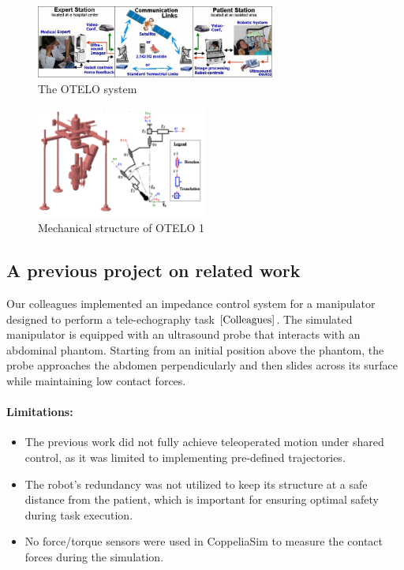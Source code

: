 \documentclass{article}
\begin{document}
\begin{figure}[h]
    \centering
    \includegraphics[width=0.7\textwidth]{OTELO.png}  
    \caption{The OTELO system}
    \label{fig:otelo}
\end{figure}


\begin{figure}[h]
    \centering
    \includegraphics[width=0.5\textwidth]{OTELO_structure.png}  
    \caption{Mechanical structure of OTELO 1}
    \label{fig:otelo struc}
\end{figure}

\subsection{A previous project on related work}
Our colleagues implemented an impedance control system for a manipulator designed to perform a tele-echography task $\cite{Colleagues}$. The simulated manipulator is equipped with an ultrasound probe that interacts with an abdominal phantom. Starting from an initial position above the phantom, the probe approaches the abdomen perpendicularly and then slides across its surface while maintaining low contact forces.

\paragraph{Limitations:}
\begin{itemize}
\item The previous work did not fully achieve teleoperated motion under shared control, as it was limited to implementing pre-defined trajectories.
\item The robot's redundancy was not utilized to keep its structure at a safe distance from the patient, which is important for ensuring optimal safety during task execution.
\item No force/torque sensors were used in CoppeliaSim to measure the contact forces during the simulation.
\end{itemize}
\par
\end{document}

